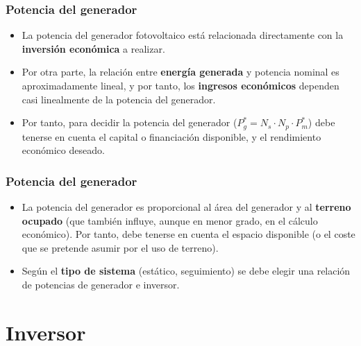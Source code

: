\documentclass[serif, xcolor=dvipsnames]{beamer}
\begin{document}
\begin{frame}
  \frametitle{Potencia del generador}
  \begin{itemize}
  \item La potencia del generador fotovoltaico está relacionada
    directamente con la \textbf{inversión económica} a realizar.
  \item Por otra parte, la relación entre \textbf{energía generada} y
    potencia nominal es aproximadamente lineal, y por tanto, los
    \textbf{ingresos económicos} dependen casi linealmente de la
    potencia del generador.
  \item Por tanto, para decidir la potencia del generador
    ($P_{g}^{*}=N_{s}\cdot N_{p}\cdot P_{m}^{*}$) debe tenerse en
    cuenta el capital o financiación disponible, y el rendimiento
    económico deseado.
  \end{itemize}

\end{frame}
\begin{frame}
  \frametitle{Potencia del generador}
  \begin{itemize}
  \item La potencia del generador es proporcional al área del
    generador y al \textbf{terreno ocupado }(que también influye,
    aunque en menor grado, en el cálculo económico). Por tanto, debe
    tenerse en cuenta el espacio disponible (o el coste que se
    pretende asumir por el uso de terreno).
  \item Según el \textbf{tipo de sistema} (estático, seguimiento) se
    debe elegir una relación de potencias de generador e inversor.
  \end{itemize}

\end{frame}


\section{Inversor}
\end{document}

